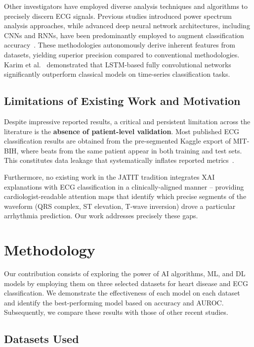 \documentclass[10pt, twocolumn]{article}
\begin{document}
Other investigators have employed diverse analysis techniques and algorithms to precisely
discern ECG signals.
Previous studies introduced power spectrum analysis approaches, while advanced deep neural
network architectures, including CNNs and RNNs, have been predominantly employed to augment
classification accuracy~\cite{chen2017}.
These methodologies autonomously derive inherent features from datasets, yielding superior
precision compared to conventional methodologies.
Karim et al.~\cite{karim2018} demonstrated that LSTM-based fully convolutional networks
significantly outperform classical models on time-series classification tasks.

\subsection{Limitations of Existing Work and Motivation}

Despite impressive reported results, a critical and persistent limitation across the
literature is the \textbf{absence of patient-level validation}.
Most published ECG classification results are obtained from the pre-segmented Kaggle
export of MIT-BIH, where beats from the same patient appear in both training and test
sets.
This constitutes data leakage that systematically inflates reported metrics~\cite{kapoor2023}.

Furthermore, no existing work in the JATIT tradition integrates XAI explanations with
ECG classification in a clinically-aligned manner -- providing cardiologist-readable
attention maps that identify which precise segments of the waveform (QRS complex, ST
elevation, T-wave inversion) drove a particular arrhythmia prediction.
Our work addresses precisely these gaps.

\section{Methodology}

Our contribution consists of exploring the power of AI algorithms, ML, and DL models by
employing them on three selected datasets for heart disease and ECG classification.
We demonstrate the effectiveness of each model on each dataset and identify the
best-performing model based on accuracy and AUROC.
Subsequently, we compare these results with those of other recent studies.

\subsection{Datasets Used}
\end{document}
